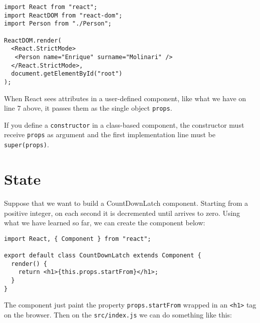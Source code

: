 \documentclass[a4paper, oneside, titlepage, 12pt]{book}
\begin{document}
\begin{verbatim}
import React from "react";
import ReactDOM from "react-dom";
import Person from "./Person";

ReactDOM.render(
  <React.StrictMode>
   <Person name="Enrique" surname="Molinari" />
  </React.StrictMode>,
  document.getElementById("root")
);
\end{verbatim}

When React sees attributes in a user-defined component, like what we have on line 7 above, it passes them as the single object \texttt{props}.

\begin{displayquote}
{\small If you define a \texttt{constructor} in a class-based component, the constructor must receive \texttt{props} as argument and the first implementation line must be \texttt{super(props)}}.
\end{displayquote}



\section{State} \label{state_section}
Suppose that we want to build a CountDownLatch component. Starting from a positive integer, on each second it is decremented until arrives to zero. Using what we have learned so far, we can create the component below:

\begin{verbatim}
import React, { Component } from "react";

export default class CountDownLatch extends Component {
  render() {
    return <h1>{this.props.startFrom}</h1>;
  }
}
\end{verbatim}

The component just paint the property \texttt{props.startFrom} wrapped in an \texttt{<h1>} tag on the browser. Then on the \texttt{src/index.js} we can do something like this:
\end{document}
